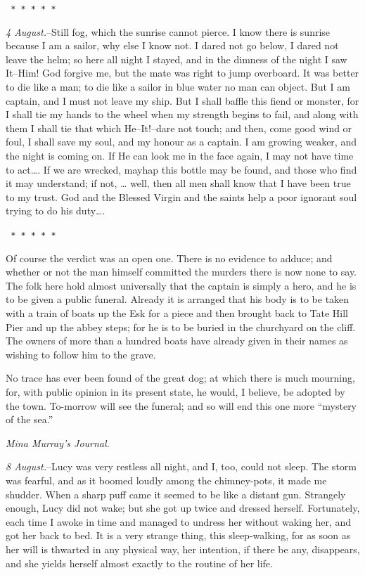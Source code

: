 \documentclass[12pt,openright]{book}
\begin{document}
\texttt{   *       *       *       *       *}

\textit{4 August.}–Still fog, which the sunrise cannot pierce. I know there is sunrise because I am a sailor, why else I know not. I dared not go below, I dared not leave the helm; so here all night I stayed, and in the dimness of the night I saw It–Him! God forgive me, but the mate was right to jump overboard. It was better to die like a man; to die like a sailor in blue water no man can object. But I am captain, and I must not leave my ship. But I shall baffle this fiend or monster, for I shall tie my hands to the wheel when my strength begins to fail, and along with them I shall tie that which He–It!–dare not touch; and then, come good wind or foul, I shall save my soul, and my honour as a captain. I am growing weaker, and the night is coming on. If He can look me in the face again, I may not have time to act…. If we are wrecked, mayhap this bottle may be found, and those who find it may understand; if not, … well, then all men shall know that I have been true to my trust. God and the Blessed Virgin and the saints help a poor ignorant soul trying to do his duty….

\texttt{   *       *       *       *       *}

Of course the verdict was an open one. There is no evidence to adduce; and whether or not the man himself committed the murders there is now none to say. The folk here hold almost universally that the captain is simply a hero, and he is to be given a public funeral. Already it is arranged that his body is to be taken with a train of boats up the Esk for a piece and then brought back to Tate Hill Pier and up the abbey steps; for he is to be buried in the churchyard on the cliff. The owners of more than a hundred boats have already given in their names as wishing to follow him to the grave.

No trace has ever been found of the great dog; at which there is much mourning, for, with public opinion in its present state, he would, I believe, be adopted by the town. To-morrow will see the funeral; and so will end this one more “mystery of the sea.”

\textit{Mina Murray’s Journal.}

\textit{8 August.}–Lucy was very restless all night, and I, too, could not sleep. The storm was fearful, and as it boomed loudly among the chimney-pots, it made me shudder. When a sharp puff came it seemed to be like a distant gun. Strangely enough, Lucy did not wake; but she got up twice and dressed herself. Fortunately, each time I awoke in time and managed to undress her without waking her, and got her back to bed. It is a very strange thing, this sleep-walking, for as soon as her will is thwarted in any physical way, her intention, if there be any, disappears, and she yields herself almost exactly to the routine of her life.
\end{document}
